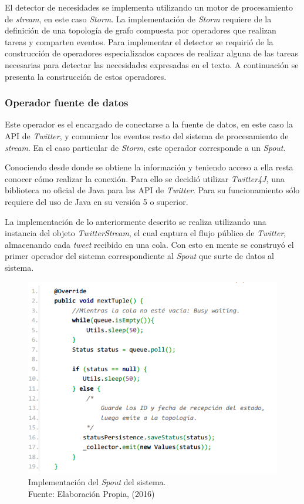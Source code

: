 El detector de necesidades se implementa utilizando un motor de procesamiento de \textit{stream}, en este caso \textit{Storm}. La implementación de \textit{Storm} requiere de la definición de una topología de grafo compuesta por operadores que realizan tareas y comparten eventos. Para implementar el detector se requirió de la construcción de operadores especializados capaces de realizar alguna de las tareas necesarias para detectar las necesidades expresadas en el texto. A continuación se presenta la construcción de estos operadores.

\subsubsection*{Operador fuente de datos}
\label{subsubseC:EntradaDeDatos}

Este operador es el encargado de conectarse a la fuente de datos, en este caso la API de \textit{Twitter}, y comunicar los eventos resto del sistema de procesamiento de \textit{stream}. En el caso particular de \textit{Storm}, este operador corresponde a un \textit{Spout}.

Conociendo desde donde se obtiene la información y teniendo acceso a ella resta conocer cómo realizar la conexión. Para ello se decidió utilizar \textit{Twitter4J}, una biblioteca no oficial de Java para las API de \textit{Twitter}. Para su funcionamiento sólo requiere del uso de Java en su versión 5 o superior.

La implementación de lo anteriormente descrito se realiza utilizando una instancia del objeto \textit{TwitterStream}, el cual captura el flujo público de \textit{Twitter}, almacenando cada \textit{tweet} recibido en una cola. Con esto en mente se construyó el primer operador del sistema correspondiente al \textit{Spout} que surte de datos al sistema.

\begin{figure}[H]
	\centering
	\captionsetup{justification=centering}
	\includegraphics[scale=0.8]{images/TwitterSpout.png}
	\caption[Implementación del \textit{Spout} del sistema.]{Implementación del \textit{Spout} del sistema.\\Fuente: Elaboración Propia, (2016)}
	\label{fig:TwitterSpout}
\end{figure}

